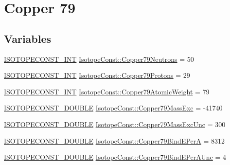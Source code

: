 \hypertarget{group___isotope_const-_copper-_cu79}{}\section{Copper 79}
\label{group___isotope_const-_copper-_cu79}
\subsection*{Variables}
\begin{DoxyCompactItemize}
\item 
\mbox{\hyperlink{group___isotope_const-_macros_ga5f18360b3e99483a35c32d789e62621c}{I\+S\+O\+T\+O\+P\+E\+C\+O\+N\+S\+T\+\_\+\+I\+NT}} \mbox{\hyperlink{group___isotope_const-_copper-_cu79_gaca10529b31b7eccc80030e0b9925e9f4}{Isotope\+Const\+::\+Copper79\+Neutrons}} = 50
\item 
\mbox{\hyperlink{group___isotope_const-_macros_ga5f18360b3e99483a35c32d789e62621c}{I\+S\+O\+T\+O\+P\+E\+C\+O\+N\+S\+T\+\_\+\+I\+NT}} \mbox{\hyperlink{group___isotope_const-_copper-_cu79_gac22136e5e0079bea43af1339bd23c3d5}{Isotope\+Const\+::\+Copper79\+Protons}} = 29
\item 
\mbox{\hyperlink{group___isotope_const-_macros_ga5f18360b3e99483a35c32d789e62621c}{I\+S\+O\+T\+O\+P\+E\+C\+O\+N\+S\+T\+\_\+\+I\+NT}} \mbox{\hyperlink{group___isotope_const-_copper-_cu79_gac116c780af99e857c209accb988505ba}{Isotope\+Const\+::\+Copper79\+Atomic\+Weight}} = 79
\item 
\mbox{\hyperlink{group___isotope_const-_macros_ga8f45a7272ce02c0b4c65c44636ed719a}{I\+S\+O\+T\+O\+P\+E\+C\+O\+N\+S\+T\+\_\+\+D\+O\+U\+B\+LE}} \mbox{\hyperlink{group___isotope_const-_copper-_cu79_ga69d79ff5f298885c3e8f0d6555070564}{Isotope\+Const\+::\+Copper79\+Mass\+Exc}} = -\/41740
\item 
\mbox{\hyperlink{group___isotope_const-_macros_ga8f45a7272ce02c0b4c65c44636ed719a}{I\+S\+O\+T\+O\+P\+E\+C\+O\+N\+S\+T\+\_\+\+D\+O\+U\+B\+LE}} \mbox{\hyperlink{group___isotope_const-_copper-_cu79_ga69f815f30255654fdce150b11adcfeb5}{Isotope\+Const\+::\+Copper79\+Mass\+Exc\+Unc}} = 300
\item 
\mbox{\hyperlink{group___isotope_const-_macros_ga8f45a7272ce02c0b4c65c44636ed719a}{I\+S\+O\+T\+O\+P\+E\+C\+O\+N\+S\+T\+\_\+\+D\+O\+U\+B\+LE}} \mbox{\hyperlink{group___isotope_const-_copper-_cu79_ga08b717986f3032a74b12fac29091ae81}{Isotope\+Const\+::\+Copper79\+Bind\+E\+PerA}} = 8312
\item 
\mbox{\hyperlink{group___isotope_const-_macros_ga8f45a7272ce02c0b4c65c44636ed719a}{I\+S\+O\+T\+O\+P\+E\+C\+O\+N\+S\+T\+\_\+\+D\+O\+U\+B\+LE}} \mbox{\hyperlink{group___isotope_const-_copper-_cu79_gadc6c028bf8555125ebc7696f44a04ec4}{Isotope\+Const\+::\+Copper79\+Bind\+E\+Per\+A\+Unc}} = 4

\end{DoxyCompactItemize}
